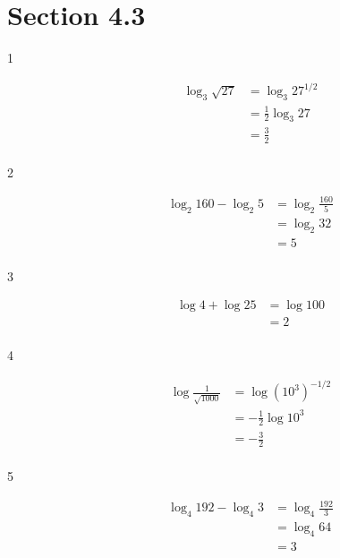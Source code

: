 \documentclass{exam}
\begin{document}
  \ifprintanswers
    \section{Section 4.3}

    \begin{description}

      \item[1] 
        \begin{align*}
          \log_3 \sqrt{27} &= \log_3 27^{1/2} \\
                           &= \frac{1}{2} \log_3 27 \\
                           &= \boxed{\frac{3}{2}} \\
        \end{align*}

      \item[2] 
        \begin{align*}
          \log_2 160 - \log_2 5 &= \log_2 \frac{160}{5} \\
                                &= \log_2 32 \\
                                &= \boxed{5} \\
        \end{align*}

      \item[3] 
        \begin{align*}
          \log 4 + \log 25 &= \log 100 \\
                           &= \boxed{2} \\
        \end{align*}

      \item[4] 
        \begin{align*}
          \log \frac{1}{\sqrt{1000}} &= \log \left( 10^3 \right)^{-1/2} \\
                                     &= - \frac{1}{2} \log 10^3 \\
                                     &= \boxed{-\frac{3}{2}} \\
        \end{align*}

      \item[5] 
        \begin{align*}
          \log_4 192 - \log_4 3 &= \log_4 \frac{192}{3} \\
                                &= \log_4 64 \\
                                &= \boxed{3} \\
        \end{align*}


\end{description}
\end{document}
